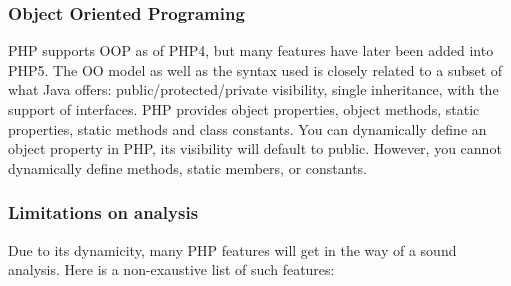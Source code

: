 \documentclass[a4paper]{article}
\begin{document}
\subsubsection{Object Oriented Programing}
PHP supports OOP as of PHP4, but many features have later been added into PHP5.
The OO model as well as the syntax used is closely related to a subset of what
Java offers: public/protected/private visibility, single inheritance, with the
support of interfaces. PHP provides object properties, object methods, static
properties, static methods and class constants. You can dynamically define an
object property in PHP, its visibility will default to public. However, you
cannot dynamically define methods, static members, or constants.

\subsubsection{Limitations on analysis}
Due to its dynamicity, many PHP features will get in the way of a sound analysis.
Here is a non-exaustive list of such features:
\end{document}
